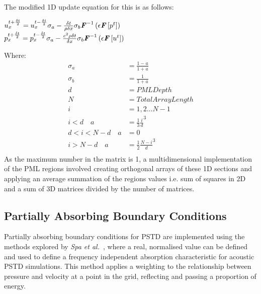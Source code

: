 The modified 1D update equation for this is as follows:\\
\begin{center}
$u^{t + \frac{\delta t}{2}}_{x} = u^{t - \frac{\delta t}{2}}_{x} \sigma_a - \frac{\delta t}{\rho \delta x} \sigma_b \textbf{\textit{F}}^{-1}\left(\epsilon \textbf{\textit{F}}\left[p^{t}\right] \right)$\\
$p^{t + \frac{\delta t}{2}}_{x} = p^{t - \frac{\delta t}{2}}_{x} \sigma_a - \frac{c^2 \rho \delta t}{\delta x} \sigma_b \textbf{\textit{F}}^{-1}\left( \epsilon \textbf{\textit{F}} \left[ u^{t} \right] \right)$\\
\end{center}
Where:\\
\begin{equation}
\begin{aligned}
\sigma_a & = \frac{1-a}{1+a} \\
\sigma_b & = \frac{1}{1 + a} \\
d & = PML Depth\\
N & = Total Array Length \\
i & = 1,2... N-1\\
i < d \quad a & = \frac{1}{3}\frac{i}{d}^3\\
d < i < N - d \quad a & = 0\\
i > N-d \quad a & = \frac{1}{2}\frac{N - i}{d}^3 \\ 
\end{aligned}
\end{equation}
As the maximum number in the matrix is 1, a multidimensional implementation of the PML regions involved creating orthogonal arrays of these 1D sections and applying an average summation of the regions values i.e. sum of squares in 2D and a sum of 3D matrices divided by the number of matrices.

\subsection{Partially Absorbing Boundary Conditions}
Partially absorbing boundary conditions for PSTD are implemented using the methods explored by \textit{Spa et al.}~\cite{Spa2011}, where a real, normalised value can be defined and used to define a frequency independent absorption characteristic for acoustic PSTD simulations. This method applies a weighting to the relationship between pressure and velocity at a point in the grid, reflecting and passing a proportion of energy.\\

